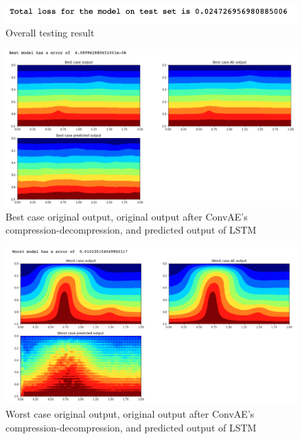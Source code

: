 \begin{figure}[H]
    \caption{Overall testing result}
    \includegraphics[scale=0.8]{Report LaTeX/figures/mantle_convection_images/larger_dataset_interpolated/LSTM_OverallTesting.png}
\end{figure}

\begin{figure}[H]
    \caption{Best case original output, original output after ConvAE's compression-decompression, and predicted output of LSTM}
    \includegraphics[scale=0.5]{Report LaTeX/figures/mantle_convection_images/larger_dataset_interpolated/LSTM_Best.png}
\end{figure}

\begin{figure}[H]
    \caption{Worst case original output, original output after ConvAE's compression-decompression, and predicted output of LSTM}
    \includegraphics[scale=0.5]{Report LaTeX/figures/mantle_convection_images/larger_dataset_interpolated/LSTM_Worst.png}
\end{figure}


